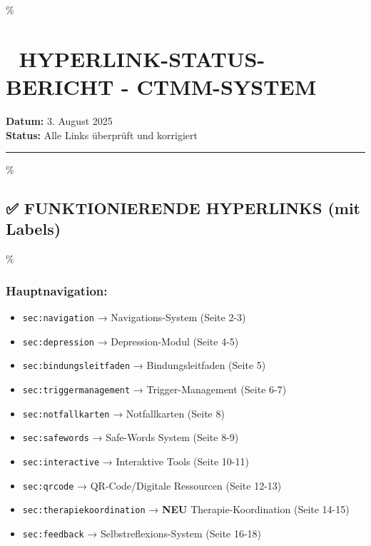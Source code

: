 \hypertarget{hyperlink-status-bericht---ctmm-system}{\%
\section{\texorpdfstring{🔗 \textbf{HYPERLINK-STATUS-BERICHT - CTMM-SYSTEM}}{🔗 HYPERLINK-STATUS-BERICHT - CTMM-SYSTEM}}\label{hyperlink-status-bericht---ctmm-system}}

\textbf{Datum:} 3. August 2025\\
\textbf{Status:} Alle Links überprüft und korrigiert

\begin{center}\rule{0.5\linewidth}{0.5pt}\end{center}

\hypertarget{funktionierende-hyperlinks-mit-labels}{\%
\subsection{\texorpdfstring{✅ \textbf{FUNKTIONIERENDE HYPERLINKS (mit Labels)}}{✅ FUNKTIONIERENDE HYPERLINKS (mit Labels)}}\label{funktionierende-hyperlinks-mit-labels}}

\hypertarget{hauptnavigation}{\%
\subsubsection{\texorpdfstring{\textbf{Hauptnavigation:}}{Hauptnavigation:}}\label{hauptnavigation}}

\begin{itemize}
\tightlist
\item
  \texttt{sec:navigation} → Navigations-System (Seite 2-3)
\item
  \texttt{sec:depression} → Depression-Modul (Seite 4-5)\\
\item
  \texttt{sec:bindungsleitfaden} → Bindungsleitfaden (Seite 5)
\item
  \texttt{sec:triggermanagement} → Trigger-Management (Seite 6-7)
\item
  \texttt{sec:notfallkarten} → Notfallkarten (Seite 8)
\item
  \texttt{sec:safewords} → Safe-Words System (Seite 8-9)
\item
  \texttt{sec:interactive} → Interaktive Tools (Seite 10-11)
\item
  \texttt{sec:qrcode} → QR-Code/Digitale Ressourcen (Seite 12-13)
\item
  \texttt{sec:therapiekoordination} → \textbf{NEU} Therapie-Koordination (Seite 14-15)
\item
  \texttt{sec:feedback} → Selbstreflexions-System (Seite 16-18)
\end{itemize}

